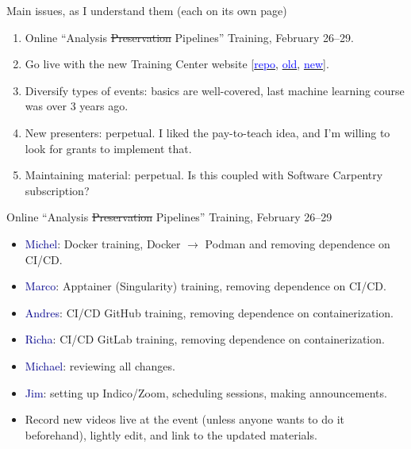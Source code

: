 \documentclass[aspectratio=169]{beamer}
\begin{document}
\begin{frame}{Main issues, as I understand them (each on its own page)}
\large
\vspace{0.5 cm}
\begin{enumerate}\setlength{\itemsep}{0.2 cm}
\item Online ``Analysis \sout{Preservation} Pipelines'' Training, February 26--29.
\item Go live with the new Training Center website [\href{https://github.com/hsf-training/training-center}{\textcolor{blue}{repo}}, \href{https://hepsoftwarefoundation.org/training/center.html}{\textcolor{blue}{old}}, \href{https://main--nimble-pothos-1ee962.netlify.app/}{\textcolor{blue}{new}}].
\item Diversify types of events: basics are well-covered, last machine learning course was over 3 years ago.
\item New presenters: perpetual. I liked the pay-to-teach idea, and I'm willing to look for grants to implement that.
\item Maintaining material: perpetual. Is this coupled with Software Carpentry subscription?
\end{enumerate}
\end{frame}

\begin{frame}{Online ``Analysis \sout{Preservation} Pipelines'' Training, February 26--29}
\vspace{0.5 cm}
\begin{itemize}\setlength{\itemsep}{0.2 cm}
\item \textcolor{darkblue}{Michel}: Docker training, Docker $\to$ Podman and removing dependence on CI/CD.
\item \textcolor{darkblue}{Marco}: Apptainer (Singularity) training, removing dependence on CI/CD.
\item \textcolor{darkblue}{Andres}: CI/CD GitHub training, removing dependence on containerization.
\item \textcolor{darkblue}{Richa}: CI/CD GitLab training, removing dependence on containerization.
\item \textcolor{darkblue}{Michael}: reviewing all changes.
\item \textcolor{darkblue}{Jim}: setting up Indico/Zoom, scheduling sessions, making announcements.
\item Record new videos live at the event (unless anyone wants to do it beforehand), lightly edit, and link to the updated materials.
\end{itemize}
\end{frame}
\end{document}
